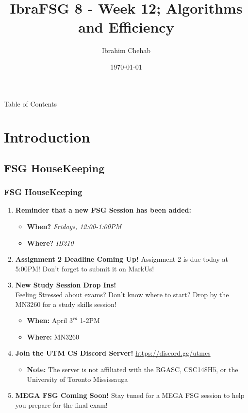 \documentclass[hyperref={colorlinks,citecolor=blue,linkcolor=blue,urlcolor=blue}, aspectratio=1610]{beamer}
\title[IbraFSG 8: The Final Week]{IbraFSG\texttrademark{} 8 - Week 12; Algorithms and Efficiency}
\author{Ibrahim Chehab}
\institute{UTM RGASC}
\date{\today}
\begin{document}
\begin{frame}
  \titlepage
\end{frame}

\begin{frame}{Table of Contents}
  \tableofcontents
\end{frame}

\section{Introduction}

\subsection{FSG HouseKeeping}
\begin{frame}
  \frametitle{FSG HouseKeeping}
  \begin{enumerate}
    \item \textbf{Reminder that a new FSG Session has been added:}
    \begin{itemize}
      \item \textbf{When?} \textit{Fridays, 12:00-1:00PM}
      \item \textbf{Where?} \textit{IB210}
    \end{itemize}
    \pause
    \item \textbf{Assignment 2 Deadline Coming Up!} Assignment 2 is due today at 5:00PM! Don't forget to submit it on MarkUs!
    \pause
    \item \textbf{New Study Session Drop Ins!} \\ Feeling Stressed about exams? Don't know where to start? Drop by the MN3260 for a study skills session! 
    \begin{itemize}
      \item \textbf{When:} April $3^{rd}$ 1-2PM
      \item \textbf{Where:} MN3260
    \end{itemize}
    \pause
    \item \textbf{Join the UTM CS Discord Server!} \url{https://discord.gg/utmcs}
    \begin{itemize}
      \item \textbf{Note:} The server is not affiliated with the RGASC, CSC148H5, or the University of Toronto Mississauga
    \end{itemize}
    \pause
    \item \textbf{MEGA FSG Coming Soon!} Stay tuned for a MEGA FSG session to help you prepare for the final exam!
  \end{enumerate}

\end{frame}
\end{document}
